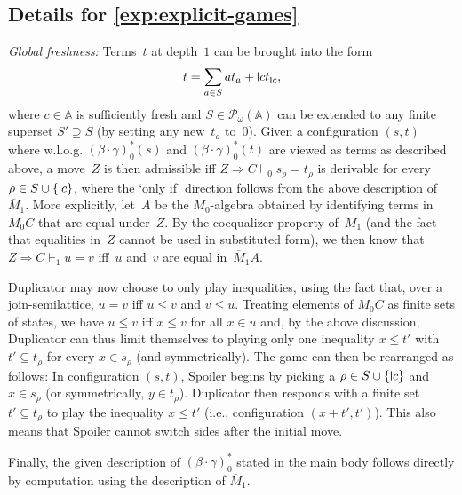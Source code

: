 \documentclass[a4paper,UKenglish,cleveref,thm-restate,numberwithinsect,final]{lipics-v2021}
\newcommand{\centails}{\Rightarrow}
\newcommand{\Names}{\mathbb{A}}
\newcommand{\pow}{\mathcal{P}}
\newcommand{\powf}{\pow_{\omega}}
\newcommand{\mbar}{\overline{M}_1}
\theoremstyle{plain}
\newcommand{\midmid}{\hspace{0.2ex}{\rule[-0.1ex]{0.6pt}{1.65ex}}\hspace{0.2ex}}
\newcommand{\scriptmidmid}{\hspace{0.2ex}{\rule[-0.1ex]{0.6pt}{1.1ex}}\hspace{0.2ex}}
\newcommand{\newletter}[1]{{\midmid}#1}
\newcommand{\scriptnew}[1]{{\scriptmidmid}#1}
\numberwithin{equation}{section}
\newcommand{\+}[1]{\mathcal{#1}\xspace}
\theoremstyle{definition}
\begin{document}
\subsection*{Details for \cref{exp:explicit-games}}

\noindent\emph{Global freshness:}
Terms~$t$ at depth~$1$ can be brought into the form
\begin{equation*}
  t = \sum_{a \in S} at_a + \newletter{c}t_{\scriptnew{c}},
\end{equation*}
where $c \in \Names$ is sufficiently fresh and $S \in \powf(\Names)$ can be extended to any finite superset $S' \supseteq S$ (by setting any new~$t_a$ to~$0$).
Given a configuration $(s,t)$ where w.l.o.g. $(\beta\cdot\gamma)^*_0(s)$ and $(\beta\cdot\gamma)^*_0(t)$ are viewed as terms as described above, a move~$Z$ is then admissible iff $Z \centails C \vdash_0 s_\rho = t_\rho$ is derivable for every $\rho \in S \cup \{\newletter{c}\}$, where the `only if' direction follows from the above description of $\mbar$.
More explicitly, let~$A$ be the $M_0$-algebra obtained by identifying terms in~$M_0C$ that are equal under~$Z$.
By the coequalizer property of~$\mbar$ (and the fact that equalities in~$Z$ cannot be used in substituted form), we then know that $Z \centails C \vdash_1 u = v$ iff~$u$ and~$v$ are equal in~$\mbar A$.

Duplicator may now choose to only play inequalities, using the fact that, over a join-semilattice, $u = v$ iff $u \le v$ and $v \le u$.
Treating elements of $M_0C$ as finite sets of states, we have $u \le v$ iff $x \le v$ for all $x \in u$ and, by the above discussion, Duplicator can thus limit themselves to playing only one inequality $x \le t'$ with $t' \subseteq t_\rho$ for every $x \in s_\rho$ (and symmetrically).
The game can then be rearranged as follows:
In configuration $(s,t)$, Spoiler begins by picking a $\rho \in S \cup \{\newletter{c}\}$ and $x \in s_\rho$ (or symmetrically, $y \in t_\rho$).
Duplicator then responds with a finite set $t' \subseteq t_\rho$ to play the inequality $x \le t'$ (i.e., configuration $(x + t',t')$).
This also means that Spoiler cannot switch sides after the initial move.

Finally, the given description of $(\beta \cdot \gamma)^*_0$ stated in the main body follows directly by computation using the description of $\mbar$.
\end{document}
